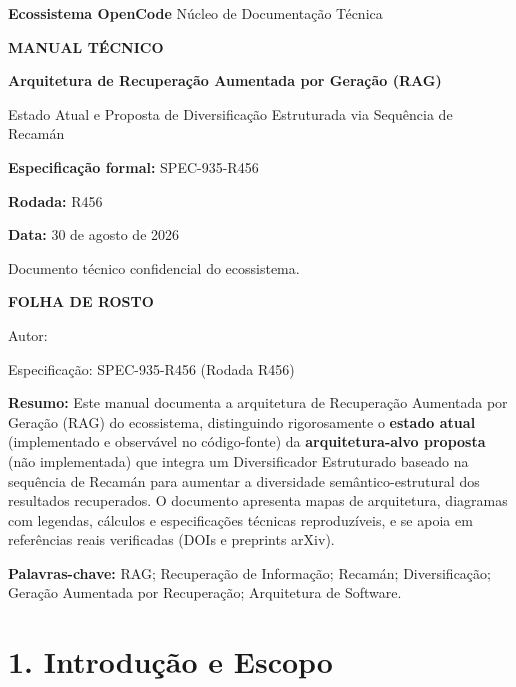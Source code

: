 \documentclass[
	article,
	11pt,
	oneside,
	a4paper,
	english,
	brazil,
	sumario=tradicional
	]{abntex2}
\renewcommand{\imprimircapa}{%
  \begin{capa}%
    \center
    \ABNTEXchapterfont\Large\textbf{Ecossistema OpenCode}
    \vspace{0.2cm}
    \ABNTEXchapterfont\large{Núcleo de Documentação Técnica}
    \vspace{2cm}

    {\ABNTEXchapterfont\bfseries\large MANUAL TÉCNICO}

    \vspace{0.6cm}
    {\ABNTEXchapterfont\bfseries\LARGE Arquitetura de Recuperação Aumentada por Geração (RAG)}

    \vspace{0.4cm}
    {\ABNTEXchapterfont\large Estado Atual e Proposta de Diversificação Estruturada via Sequência de Recamán}

    \vspace{2.5cm}
    {\large\textbf{Especificação formal:} SPEC-935-R456}

    \vspace{0.3cm}
    {\large\textbf{Rodada:} R456}

    \vspace{0.3cm}
    {\large\textbf{Data:} 30 de agosto de 2026}

    \vspace{1.5cm}
    {\small Documento técnico confidencial do ecossistema.}

  \end{capa}%
}
\begin{document}
\imprimircapa
\newpage
\begin{center}
{\ABNTEXchapterfont\bfseries\large FOLHA DE ROSTO}
\end{center}
\vspace{0.8cm}
\begin{center}
{\large\imprimirtitulo}
\end{center}
\vspace{1cm}
\begin{center}
{\normalsize Autor: \imprimirautor}
\end{center}
\vspace{0.5cm}
\begin{center}
{\normalsize Especificação: SPEC-935-R456 (Rodada R456)}
\end{center}
\vspace{1cm}
\textbf{Resumo:} Este manual documenta a arquitetura de Recuperação Aumentada por
Geração (RAG) do ecossistema, distinguindo rigorosamente o \textbf{estado atual}
(implementado e observável no código-fonte) da \textbf{arquitetura-alvo proposta}
(não implementada) que integra um Diversificador Estruturado baseado na sequência
de Recamán para aumentar a diversidade semântico-estrutural dos resultados
recuperados. O documento apresenta mapas de arquitetura, diagramas com legendas,
cálculos e especificações técnicas reproduzíveis, e se apoia em referências reais
verificadas (DOIs e preprints arXiv).

\vspace{0.5cm}
\textbf{Palavras-chave:} RAG; Recuperação de Informação; Recamán; Diversificação;
Geração Aumentada por Recuperação; Arquitetura de Software.

\newpage
\tableofcontents*
\clearpage

\listoffigures*
\clearpage
{}
\listoftables*
\clearpage

\section*{1. Introdução e Escopo}
\end{document}

